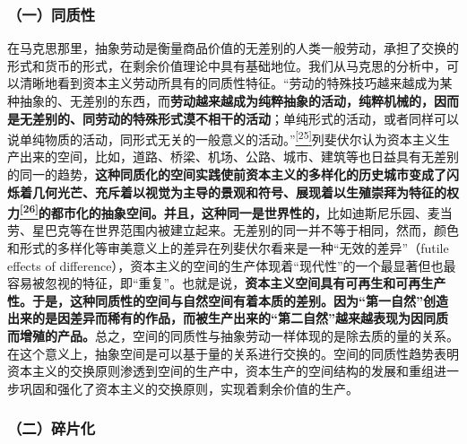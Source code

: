\documentclass[UTF8, fontset = sourcesans, a4paper, oneside, zihao =
-4, scheme=chinese, no-math, space=true]{ctexbook}
\begin{document}
\subsubsection{（一）同质性}\label{part0007_split_001.htmlux5cux23d011}

在马克思那里，抽象劳动是衡量商品价值的无差别的人类一般劳动，承担了交换的形式和货币的形式，在剩余价值理论中具有基础地位。我们从马克思的分析中，可以清晰地看到资本主义劳动所具有的同质性特征。``劳动的特殊技巧越来越成为某种抽象的、无差别的东西，而\textbf{劳动越来越成为纯粹抽象的活动，纯粹机械的，因而是无差别的、同劳动的特殊形式漠不相干的活动}；单纯形式的活动，或者同样可以说单纯物质的活动，同形式无关的一般意义的活动。''\protect\hypertarget{part0007_split_001.htmlux5cux23w25}{}{}\protect\hyperlink{part0007_split_004.htmlux5cux23m25}{\textsuperscript{{[}25{]}}}列斐伏尔认为资本主义生产出来的空间，比如，道路、桥梁、机场、公路、城市、建筑等也日益具有无差别的同一的趋势，\textbf{这种同质化的空间实践使前资本主义的多样化的历史城市变成了闪烁着几何光芒、充斥着以视觉为主导的景观和符号、展现着以生殖崇拜为特征的权力\protect\hypertarget{part0007_split_001.htmlux5cux23w26}{}{}\protect\hyperlink{part0007_split_004.htmlux5cux23m26}{\textsuperscript{{[}26{]}}}的都市化的抽象空间。并且，这种同一是世界性的，}比如迪斯尼乐园、麦当劳、星巴克等在世界范围内被建立起来。无差别的同一并不等于相同，然而，颜色和形式的多样化等审美意义上的差异在列斐伏尔看来是一种``无效的差异''（futile effects of difference），资本主义的空间的生产体现着``现代性''的一个最显著但也最容易被忽视的特征，即``重复''。也就是说，\textbf{资本主义空间具有可再生和可再生产性。于是，这种同质性的空间与自然空间有着本质的差别。因为``第一自然''创造出来的是因差异而稀有的作品，而被生产出来的``第二自然''越来越表现为因同质而增殖的产品。}总之，空间的同质性与抽象劳动一样体现的是除去质的量的关系。在这个意义上，抽象空间是可以基于量的关系进行交换的。空间的同质性趋势表明资本主义的交换原则渗透到空间的生产中，资本生产的空间结构的发展和重组进一步巩固和强化了资本主义的交换原则，实现着剩余价值的生产。

\subsubsection{（二）碎片化}\label{part0007_split_001.htmlux5cux23d012}
\end{document}
